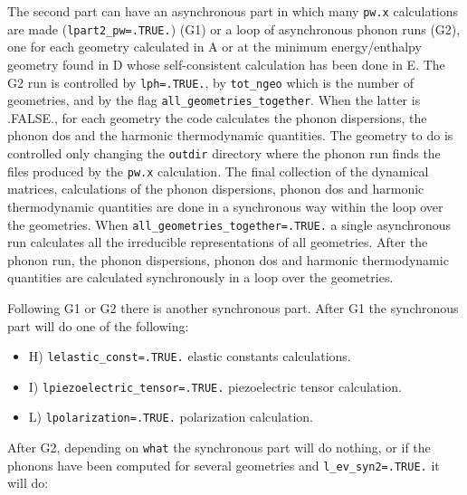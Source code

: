 \documentclass[12pt,a4paper]{article}
\begin{document}
The second part can have an asynchronous part in which
many \texttt{pw.x} calculations are made (\texttt{lpart2\_pw=.TRUE.}) (G1)
or a loop of asynchronous phonon runs (G2), one for each geometry calculated
in A or at the minimum energy/enthalpy geometry
found in D whose self-consistent calculation has been done in E.
The G2 run is controlled by \texttt{lph=.TRUE.}, by \texttt{tot\_ngeo} which 
is the number of geometries, and by the flag 
\texttt{all\_geometries\_together}. When the latter is .FALSE.,
for each geometry the code calculates the phonon dispersions, the phonon 
dos and the 
harmonic thermodynamic quantities. The geometry to do is controlled only 
changing the \texttt{outdir} directory where the phonon run finds the
files produced by the \texttt{pw.x} calculation. The final collection
of the dynamical matrices, calculations of the phonon dispersions, phonon 
dos and harmonic thermodynamic quantities are done in a synchronous way 
within the loop over the geometries.
When \texttt{all\_geometries\_together=.TRUE.} a single asynchronous run
calculates all the irreducible representations of all geometries. After
the phonon run, the phonon dispersions, phonon dos and harmonic 
thermodynamic quantities are calculated synchronously in a loop over 
the geometries.

Following G1 or G2 there is another synchronous part. 
After G1 the synchronous part will do one of the following:

\begin{itemize}

\item
H) \texttt{lelastic\_const=.TRUE.} elastic constants calculations.

\item
I) \texttt{lpiezoelectric\_tensor=.TRUE.} piezoelectric tensor calculation.

\item
L) \texttt{lpolarization=.TRUE.} polarization calculation.

\end{itemize}

After G2, depending on \texttt{what} the synchronous part will do nothing, 
or if the phonons have been computed for several geometries and
\texttt{l\_ev\_syn2=.TRUE.} it will do:
\end{document}

